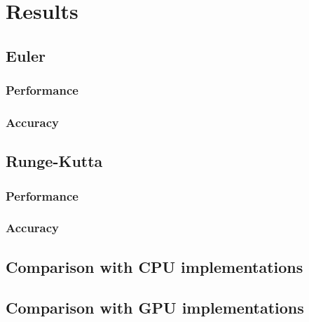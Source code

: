 
\chapter{Results}

\section{Euler}

\subsection{Performance}
\subsection{Accuracy}

\section{Runge-Kutta}

\subsection{Performance}
\subsection{Accuracy}

\section{Comparison with CPU implementations}
\section{Comparison with GPU implementations}





